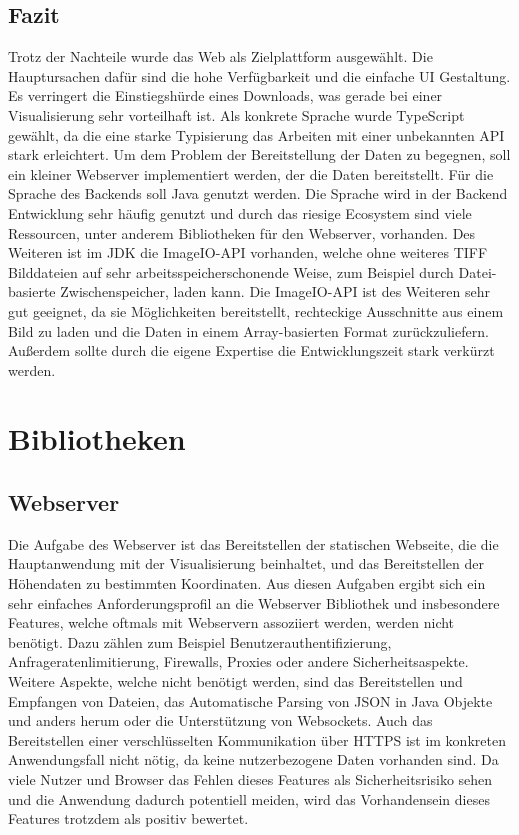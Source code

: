 \subsection{Fazit}
Trotz der Nachteile wurde das Web als Zielplattform ausgewählt. Die Hauptursachen dafür sind die hohe Verfügbarkeit und die einfache UI Gestaltung. Es verringert die Einstiegshürde eines Downloads, was gerade bei einer Visualisierung sehr vorteilhaft ist. Als konkrete Sprache wurde TypeScript gewählt, da die eine starke Typisierung das Arbeiten mit einer unbekannten API stark erleichtert. Um dem Problem der Bereitstellung der Daten zu begegnen, soll ein kleiner Webserver implementiert werden, der die Daten bereitstellt. Für die Sprache des Backends soll Java genutzt werden. Die Sprache wird in der Backend Entwicklung sehr häufig genutzt und durch das riesige Ecosystem sind viele Ressourcen, unter anderem Bibliotheken für den Webserver, vorhanden. Des Weiteren ist im JDK die ImageIO-API vorhanden, welche ohne weiteres TIFF Bilddateien auf sehr arbeitsspeicherschonende Weise, zum Beispiel durch Datei-basierte Zwischenspeicher, laden kann. Die ImageIO-API ist des Weiteren sehr gut geeignet, da sie Möglichkeiten bereitstellt, rechteckige Ausschnitte aus einem Bild zu laden und die Daten in einem Array-basierten Format zurückzuliefern. Außerdem sollte durch die eigene Expertise die Entwicklungszeit stark verkürzt werden.

\section{Bibliotheken}

\subsection{Webserver}
Die Aufgabe des Webserver ist das Bereitstellen der statischen Webseite, die die Hauptanwendung mit der Visualisierung beinhaltet, und das Bereitstellen der Höhendaten zu bestimmten Koordinaten. Aus diesen Aufgaben ergibt sich ein sehr einfaches Anforderungsprofil an die Webserver Bibliothek und insbesondere Features, welche oftmals mit Webservern assoziiert werden, werden nicht benötigt. Dazu zählen zum Beispiel Benutzerauthentifizierung, Anfrageratenlimitierung, Firewalls, Proxies oder andere Sicherheitsaspekte. Weitere Aspekte, welche nicht benötigt werden, sind das Bereitstellen und Empfangen von Dateien, das Automatische Parsing von JSON in Java Objekte und anders herum oder die Unterstützung von Websockets. Auch das Bereitstellen einer verschlüsselten Kommunikation über HTTPS ist im konkreten Anwendungsfall nicht nötig, da keine nutzerbezogene Daten vorhanden sind. Da viele Nutzer und Browser das Fehlen dieses Features als Sicherheitsrisiko sehen und die Anwendung dadurch potentiell meiden, wird das Vorhandensein dieses Features trotzdem als positiv bewertet.

